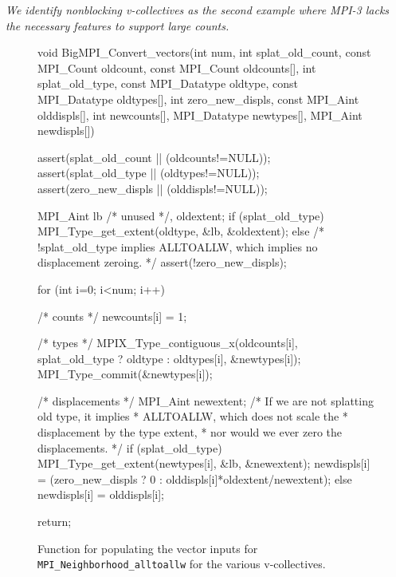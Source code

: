 \textit{We identify nonblocking v-collectives as the second example
where MPI-3 lacks the necessary features to support large counts.}

\begin{figure}
\begin{code}
void BigMPI_Convert_vectors(int num,
                            int splat_old_count,
                            const MPI_Count oldcount,
                            const MPI_Count oldcounts[],
                            int splat_old_type,
                            const MPI_Datatype oldtype,
                            const MPI_Datatype oldtypes[],
                            int zero_new_displs,
                            const MPI_Aint olddispls[],
                            int newcounts[],
                            MPI_Datatype newtypes[],
                            MPI_Aint newdispls[])
{
    assert(splat_old_count || (oldcounts!=NULL));
    assert(splat_old_type  || (oldtypes!=NULL));
    assert(zero_new_displs || (olddispls!=NULL));

    MPI_Aint lb /* unused */, oldextent;
    if (splat_old_type) {
        MPI_Type_get_extent(oldtype, &lb, &oldextent);
    } else {
        /* !splat_old_type implies ALLTOALLW, 
            which implies no displacement zeroing. */
        assert(!zero_new_displs);
    }

    for (int i=0; i<num; i++) {
        /* counts */
        newcounts[i] = 1;

        /* types */
        MPIX_Type_contiguous_x(oldcounts[i], 
                       splat_old_type ? oldtype : oldtypes[i], 
                       &newtypes[i]);
        MPI_Type_commit(&newtypes[i]);

        /* displacements */
        MPI_Aint newextent;
        /* If we are not splatting old type, it implies 
         *  ALLTOALLW, which does not scale the 
         * displacement by the type extent,
         * nor would we ever zero the displacements. */
        if (splat_old_type) {
            MPI_Type_get_extent(newtypes[i], &lb, &newextent);
            newdispls[i] = (zero_new_displs ? 0 : 
                            olddispls[i]*oldextent/newextent);
        } else {
            newdispls[i] = olddispls[i];
        }
    }
    return;
}
\end{code}
\label{code:BigMPI_Convert_vectors}
\caption{Function for populating the vector inputs 
for \texttt{MPI\_Neighborhood\_alltoallw} for the various v-collectives.}
\end{figure}

